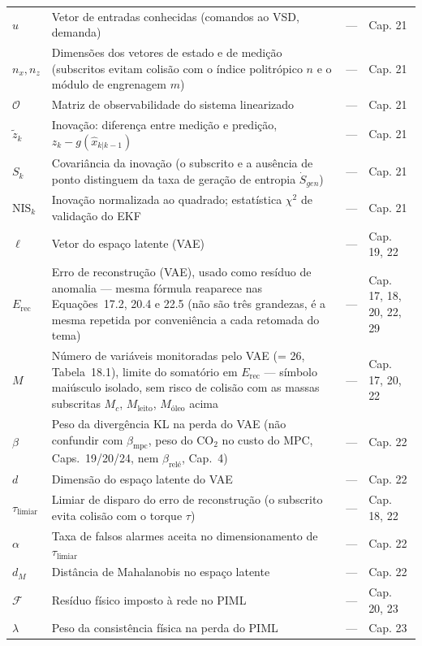 \documentclass[12pt,a4paper]{article}
\numberwithin{equation}{section}
\numberwithin{table}{section}
\numberwithin{figure}{section}
\begin{document}
{\begin{longtable}{>{\raggedright\arraybackslash}p{2.8cm} >{\raggedright\arraybackslash}p{5.3cm} >{\raggedright\arraybackslash}p{2.1cm} >{\raggedright\arraybackslash}p{4.2cm}}
	$u$ & Vetor de entradas conhecidas (comandos ao VSD, demanda) & --- & Cap. 21 \\
	$n_x, n_z$\dag & Dimensões dos vetores de estado e de medição (subscritos evitam colisão com o índice politrópico $n$ e o módulo de engrenagem $m$) & --- & Cap. 21 \\
	$\mathcal{O}$ & Matriz de observabilidade do sistema linearizado & --- & Cap. 21 \\
	$\tilde{z}_k$ & Inovação: diferença entre medição e predição, $z_k - g(\hat{x}_{k|k-1})$ & --- & Cap. 21 \\
	$S_k$\dag & Covariância da inovação (o subscrito e a ausência de ponto distinguem da taxa de geração de entropia $\dot{S}_{gen}$) & --- & Cap. 21 \\
	$\text{NIS}_k$ & Inovação normalizada ao quadrado; estatística $\chi^2$ de validação do EKF & --- & Cap. 21 \\
	$\ell$\dag & Vetor do espaço latente (VAE) & --- & Cap. 19, 22 \\
	$E_{\text{rec}}$ & Erro de reconstrução (VAE), usado como resíduo de anomalia — mesma fórmula reaparece nas Equações~17.2, 20.4 e 22.5 (não são três grandezas, é a mesma repetida por conveniência a cada retomada do tema) & --- & Cap. 17, 18, 20, 22, 29 \\
	$M$ & Número de variáveis monitoradas pelo VAE (= 26, Tabela~18.1), limite do somatório em $E_{\text{rec}}$ — símbolo maiúsculo isolado, sem risco de colisão com as massas subscritas $M_c$, $M_{\text{leito}}$, $M_{\text{óleo}}$ acima & --- & Cap. 17, 20, 22 \\
	$\beta$ & Peso da divergência KL na perda do VAE (não confundir com $\beta_{\text{mpc}}$, peso do CO$_2$ no custo do MPC, Caps.~19/20/24, nem $\beta_{\text{relé}}$, Cap.~4) & --- & Cap. 22 \\
	$d$ & Dimensão do espaço latente do VAE & --- & Cap. 22 \\
	$\tau_{\text{limiar}}$\dag & Limiar de disparo do erro de reconstrução (o subscrito evita colisão com o torque $\tau$) & --- & Cap. 18, 22 \\
	$\alpha$ & Taxa de falsos alarmes aceita no dimensionamento de $\tau_{\text{limiar}}$ & --- & Cap. 22 \\
	$d_M$ & Distância de Mahalanobis no espaço latente & --- & Cap. 22 \\
	$\mathcal{F}$ & Resíduo físico imposto à rede no PIML & --- & Cap. 20, 23 \\
	$\lambda$ & Peso da consistência física na perda do PIML & --- & Cap. 23 \\

\end{longtable}}
\end{document}
